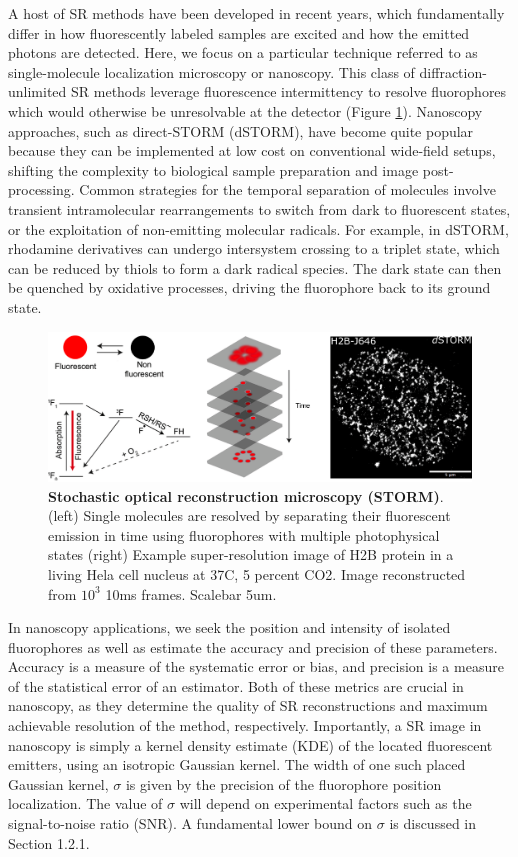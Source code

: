 A host of SR methods have been developed in recent years, which fundamentally differ in how fluorescently labeled samples are excited and how the emitted photons are detected. Here, we focus on a particular technique referred to as single-molecule localization microscopy or nanoscopy. This class of diffraction-unlimited SR methods leverage fluorescence intermittency to resolve fluorophores which would otherwise be unresolvable at the detector (Figure \ref{fig:fig1}). Nanoscopy approaches, such as direct-STORM (dSTORM), have become quite popular because they can be implemented at low cost on conventional wide-field setups, shifting the complexity to biological sample preparation and image post-processing. Common strategies for the temporal separation of molecules involve transient intramolecular rearrangements to switch from dark to fluorescent states, or the exploitation of non-emitting molecular radicals. For example, in dSTORM, rhodamine derivatives can undergo intersystem crossing to a triplet state, which can be reduced by thiols to form a dark radical species. The dark state can then be quenched by oxidative processes, driving the fluorophore back to its ground state. 

\begin{figure}[t]
\centering
\includegraphics[width=15cm]{media/Intro.png}
\caption{\textbf{Stochastic optical reconstruction microscopy (STORM)}. (left) Single molecules are resolved by separating their fluorescent emission in time using fluorophores with multiple photophysical states (right) Example super-resolution image of H2B protein in a living Hela cell nucleus at 37C, 5 percent CO2. Image reconstructed from $10^{3}$ 10ms frames. Scalebar 5um.}
\label{fig:fig1}
\end{figure}

In nanoscopy applications, we seek the position and intensity of isolated fluorophores as well as estimate the accuracy and precision of these parameters. Accuracy is a measure of the systematic error or bias, and precision is a measure of the statistical error of an estimator. Both of these metrics are crucial in nanoscopy, as they determine the quality of SR reconstructions and maximum achievable resolution of the method, respectively. Importantly, a SR image in nanoscopy is simply a kernel density estimate (KDE) of the located fluorescent emitters, using an isotropic Gaussian kernel. The width of one such placed Gaussian kernel, $\sigma$ is given by the precision of the fluorophore position localization. The value of $\sigma$ will depend on experimental factors such as the signal-to-noise ratio (SNR). A fundamental lower bound on $\sigma$ is discussed in Section 1.2.1.

